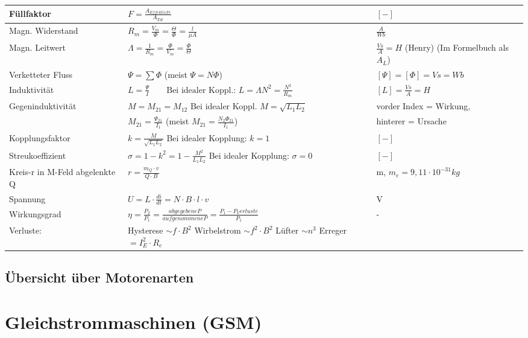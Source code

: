 \begin{tabular}[c]{ | p{5cm} | p{8cm} | p{4cm} | }
		\hline
		Füllfaktor
		&$F=\frac{A_{Effektiv Fe}}{A_{Tot}}$
		& $[-]$\\
		\hline
		Magn. Widerstand
		& $R_m = \frac{V_m}{\Phi} = \frac{\Theta}{\Phi} = \frac{l}{\mu A} $
		& $\frac{A}{Wb}$ \\
		\hline
		Magn. Leitwert
		& $\Lambda = \frac{1}{R_m} = \frac{\Phi}{V_m}=\frac{\Phi}{\Theta}$
		& $\frac{Vs}{A} = H$ (Henry) (Im Formelbuch als $A_L$)\\
		\hline
		Verketteter Fluss
		& $\Psi = \sum \Phi $ (meist $\Psi = N \Phi$)
		& $[\Psi] = [\Phi] = Vs = Wb$\\
		\hline
		Induktivität
		& $L = \frac{\Psi}{I}  \qquad \text{Bei idealer Koppl.: } L = \Lambda N^2 = \frac{N^2}{R_m} $
		& $[L] = \frac{Vs}{A} = H$\\
		\hline
		Gegeninduktivität
		& $M = M_{21} = M_{12}$ Bei idealer Koppl. $M = \sqrt{L_1 L_2}$
		& vorder Index = Wirkung,\\
		&$M_{21} = \frac{\Psi_{21}}{I_1}$  (meist $M_{21} = \frac{N_2 \Phi_{21}}{I_1}$)
		& hinterer = Ursache\\
		\hline
		Kopplungsfaktor
		& $k = \frac{M}{\sqrt{L_1 L_2}}$ Bei idealer Kopplung: $k = 1$
		& $[-]$ \\
		\hline
		Streukoeffizient
		& $\sigma = 1 - k^2 = 1 -\frac{M^2}{L_1 L_2}$ Bei idealer Kopplung: $\sigma = 0$
		& $[-]$\\
		\hline
		Kreis-r in M-Feld abgelenkte Q
		& $r = \frac{m_Q \cdot v}{Q \cdot B}$
		&m, $ m_e = 9,11 \cdot 10^{-31} kg$ \\
		\hline
		Spannung
		& $U = L \cdot \frac{di}{dt}=N \cdot B \cdot l \cdot v$
		& V\\
		\hline
		Wirkungsgrad
		& $\eta = \frac{P_2}{P_1}=\frac{abgegebene P}{aufgenommene P}= \frac{P_1 -
		P_Verluste}{P_1}$
		& -\\
		\hline
		Verluste:
		&Hysterese 	$\sim f \cdot B^2$ \qquad
		Wirbelstrom $\sim f^2 \cdot B^2$ \qquad
		Lüfter	$	\sim n^3$ \qquad\qquad
		Erreger$		= I_E ^2 \cdot R_e $&\\
		\hline
	\end{tabular}
	\renewcommand{\arraystretch}{1}	
	
	\subsection{Übersicht über Motorenarten}

\section{Gleichstrommaschinen (GSM)}
